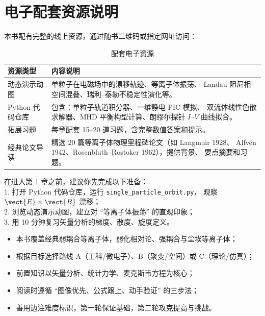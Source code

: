 \section*{电子配套资源说明}

本书配有完整的线上资源，通过随书二维码或指定网址访问：

\begin{table}[htbp]
\centering
\caption{配套电子资源}
\begin{tabular}{@{}lp{9cm}@{}}
\toprule
\textbf{资源类型} & \textbf{内容说明} \\
\midrule
动态演示动图 & 单粒子在电磁场中的漂移轨迹、等离子体振荡、
Landau 阻尼相空间混叠、瑞利--泰勒不稳定性演化等。 \\
Python 代码仓库 & 包含：单粒子轨道积分器、一维静电 PIC 模拟、
双流体线性色散求解器、MHD 平衡构型计算、朗缪尔探针 $I$--$V$ 曲线拟合。 \\
拓展习题 & 每章配套 15--20 道习题，含完整数值答案和提示。 \\
经典论文导读 & 精选 20 篇等离子体物理里程碑论文（如 Langmuir 1928、
Alfv\'{e}n 1942、Rosenbluth--Rostoker 1962），提供背景、
要点摘要和习题。 \\
\bottomrule
\end{tabular}
\end{table}

\begin{miniquiz}
在进入第 1 章之前，建议你先完成以下准备：\\
1. 打开 Python 代码仓库，运行 \texttt{single\_particle\_orbit.py}，
观察 $\vect{E}\times\vect{B}$ 漂移；\\
2. 浏览动态演示动图，建立对 ``等离子体振荡'' 的直观印象；\\
3. 用 10 分钟复习矢量分析的梯度、散度、旋度定义。
\end{miniquiz}

\begin{chapterreview}
\begin{itemize}
\item 本书覆盖经典弱耦合等离子体，弱化相对论、强耦合与尘埃等离子体；
\item 根据目标选择路线 A（工科/微电子）、B（聚变/空间）或 C（理论/仿真）；
\item 前置知识以矢量分析、统计力学、麦克斯韦方程为核心；
\item 阅读时遵循 ``图像优先、公式跟上、动手验证'' 的三步法；
\item 善用边注难度标识，第一轮保证基础，第二轮攻克提高与挑战。
\end{itemize}
\end{chapterreview}


\newpage

